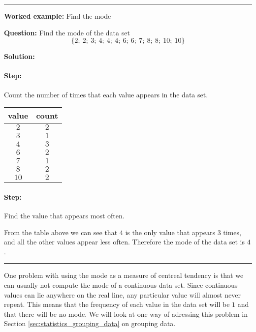 \documentclass[a4paper,11pt]{report}
\newenvironment{wex}[3]%
{\rule{\linewidth}{0.5mm}
\textbf{Worked example:} #1

\textbf{Question:} #2

\textbf{Solution:} #3}%
{\rule{\linewidth}{0.5mm}}
\newcommand{\westep}[1]{\paragraph{Step:} #1}
\begin{document}
\begin{wex}{Find the mode}{
    Find the mode of the data set
    \begin{equation}
      \{2;\ 2;\ 3;\ 4;\ 4;\ 4;\ 6;\ 6;\ 7;\ 8;\ 8;\ 10;\ 10\}
    \end{equation}
}{
  \westep{Count the number of times that each value appears in the data
    set.}

  \begin{center}
    \begin{tabular}{cc}
      \toprule
      value & count \\
      \midrule
      $2$ & $2$ \\
      $3$ & $1$ \\
      $4$ & $3$ \\
      $6$ & $2$ \\
      $7$ & $1$ \\
      $8$ & $2$ \\
      $10$ & $2$ \\
      \bottomrule
    \end{tabular}
  \end{center}

  \westep{Find the value that appears most often.}

  From the table above we can see that $4$ is the only value that
  appears $3$ times, and all the other values appear less
  often. Therefore the mode of the data set is $4$.

}
\end{wex}

One problem with using the mode as a measure of centreal tendency is
that we can usually not compute the mode of a continuous data
set. Since continuous values can lie anywhere on the real line, any
particular value will almost never repeat. This means that the
frequency of each value in the data set will be $1$ and that there will
be no mode. We will look at one way of adressing this problem in
Section \ref{sec:statistics_grouping_data} on grouping data.
\end{document}
